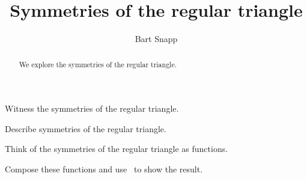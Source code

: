 \documentclass[noauthor,nooutcomes,12pt,hints]{ximera}
\title{Symmetries of the regular triangle}
\author{Bart Snapp}
\begin{document}
\begin{abstract}
  We explore the symmetries of the regular triangle.
\end{abstract}
\maketitle

\begin{listOutcomes}
\item Witness the symmetries of the regular triangle.
\item Describe symmetries of the regular triangle.
\item Think of the symmetries of the regular triangle as functions.
\item Compose these functions and use \snap\ to show the result.
\end{listOutcomes}
\mynewpage
\end{document}
